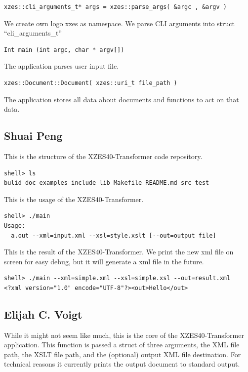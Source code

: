 \begin{lstlisting}
xzes::cli_arguments_t* args = xzes::parse_args( &argc , &argv )
\end{lstlisting}

We create own logo xzes as namespace. We parse CLI arguments into struct ``cli\_arguments\_t''

\begin{lstlisting}
Int main (int argc, char * argv[])
\end{lstlisting}
The application parses user input file. 

\begin{lstlisting}
xzes::Document::Document( xzes::uri_t file_path )
\end{lstlisting}
The application stores all data about documents and functions to act on that data. 

\subsection{Shuai Peng}

This is the structure of the XZES40-Transformer code repository.

\begin{lstlisting}
shell> ls
bulid doc examples include lib Makefile README.md src test
\end{lstlisting}

This is the usage of the XZES40-Transformer.

\begin{lstlisting}
shell> ./main
Usage:
  a.out --xml=input.xml --xsl=style.xslt [--out=output file]
\end{lstlisting}

This is the result of the XZES40-Transformer. We print the new xml file on screen for easy debug, but it will generate a xml file in the future.

\begin{lstlisting}
shell> ./main --xml=simple.xml --xsl=simple.xsl --out=result.xml
<?xml version="1.0" encode="UTF-8"?><out>Hello</out>
\end{lstlisting}

\subsection{Elijah C. Voigt}

While it might not seem like much, this is the core of the XZES40-Transformer application.
This function is passed a struct of three arguments, the XML file path, the XSLT file path, and the (optional) output XML file destination.
For technical reasons it currently prints the output document to standard output.

